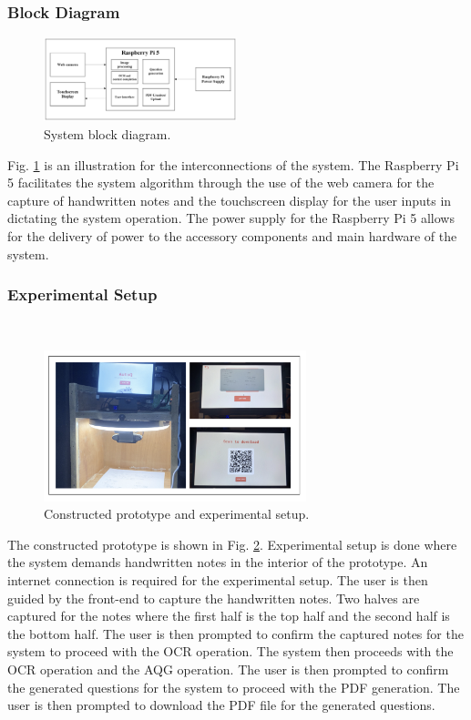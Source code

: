 \documentclass[conference]{IEEEtran}
\begin{document}
\subsubsection{Block Diagram}
\hfill 
\begin{figure}[H]
\centerline{\includegraphics[width=0.5\textwidth]{blockdiag.png}}
\vspace{-0.4cm}
\caption{System block diagram.} 
\label{blockdiag}
\end{figure}
\indent Fig. \ref{blockdiag} is an illustration for the interconnections 
of the system. The Raspberry Pi 5 facilitates the system algorithm 
through the use of the web camera for the capture of handwritten notes and 
the touchscreen display for the user inputs in dictating the system 
operation. The power supply for the Raspberry Pi 5 allows for the delivery 
of power to the accessory components and main hardware of the system.
    \vspace{0.1cm}
    \subsubsection{Experimental Setup}
    \hfill \\
\vspace{-0.6cm}
\begin{figure}[H]
\centerline{\includegraphics[width=3in]{experimental.png}}
\vspace{-0.4cm}
\caption{Constructed prototype and experimental setup.} 
\label{experimental_setup}
\end{figure}
\indent The constructed prototype is shown in Fig. \ref{experimental_setup}.
Experimental setup is done where the system demands handwritten notes 
in the interior of the prototype. An internet connection is required for
the experimental setup. The user is then guided by the front-end 
to capture the handwritten notes. Two halves are captured for the
notes where the first half is the top half and the second half is the
bottom half. The user is then prompted to confirm the captured notes
for the system to proceed with the OCR operation. The system then
proceeds with the OCR operation and the AQG operation. The user is then
prompted to confirm the generated questions for the system to proceed
with the PDF generation. The user is then prompted to download the PDF
file for the generated questions.
\end{document}

